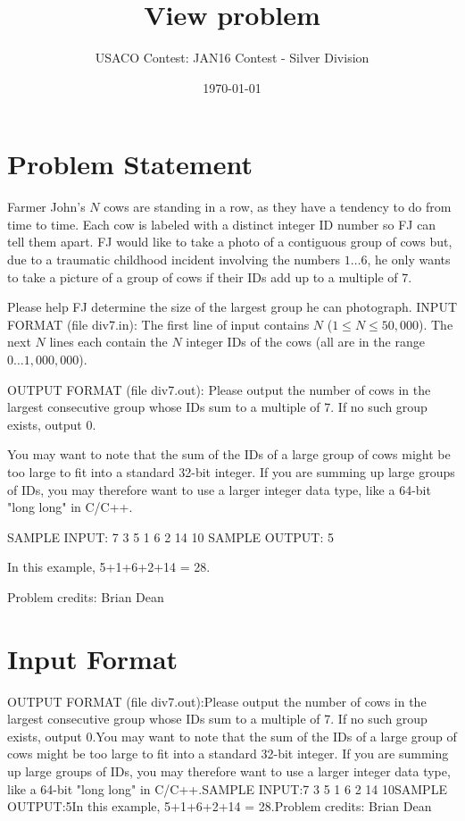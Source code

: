 \documentclass[12pt]{article}
\title{View problem}
\author{USACO Contest: JAN16 Contest - Silver Division}
\date{\today}
\begin{document}
\maketitle

\section*{Problem Statement}

Farmer John's $N$ cows are standing in a row, as they have a tendency to do from
time to time.  Each cow is labeled with a distinct integer ID number so FJ can
tell them apart. FJ would like to take a photo of a contiguous group of cows
but, due to a traumatic  childhood incident involving the numbers $1 \ldots 6$,
he only wants to take a picture of a group of cows if their IDs add up to a
multiple of 7.  

Please help FJ determine the size of the largest group he can photograph.  
INPUT FORMAT (file div7.in):
The first line of input contains $N$ ($1 \leq N \leq 50,000$).  The next $N$
lines each contain the $N$ integer IDs of the cows (all are in the range
$0 \ldots 1,000,000$).

OUTPUT FORMAT (file div7.out):
Please output the number of cows in the largest consecutive group whose IDs sum
to a multiple of 7.  If no such group exists, output 0.  

You may want to note that the sum of the IDs of a large group of cows might be
too large to fit into a standard 32-bit integer.  If you are summing up large
groups of IDs, you may therefore want to use a larger integer data type, like a
64-bit "long long" in C/C++.

SAMPLE INPUT:
7
3
5
1
6
2
14
10
SAMPLE OUTPUT: 
5

In this example, 5+1+6+2+14 = 28.

Problem credits: Brian Dean



\section*{Input Format}
OUTPUT FORMAT (file div7.out):Please output the number of cows in the largest consecutive group whose IDs sum
to a multiple of 7.  If no such group exists, output 0.You may want to note that the sum of the IDs of a large group of cows might be
too large to fit into a standard 32-bit integer.  If you are summing up large
groups of IDs, you may therefore want to use a larger integer data type, like a
64-bit "long long" in C/C++.SAMPLE INPUT:7
3
5
1
6
2
14
10SAMPLE OUTPUT:5In this example, 5+1+6+2+14 = 28.Problem credits: Brian Dean
\end{document}
